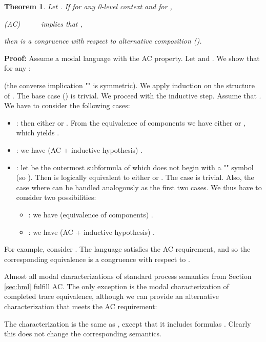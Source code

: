 \documentclass{eptcs}
\newtheorem{theo}{Theorem}
\newenvironment{theorem}{\begin{theo} \rm }{\end{theo}}
\newenvironment{proof}{\begin{trivlist} \item[\hspace{\labelsep}\bf Proof:]}{\hfill  \end{trivlist}}
\begin{document}
\begin{theorem} 
Let . If for any 0-level context  and  for ,
\begin{center}
(AC)~~~~~ implies that ,
\end{center}
then  is a congruence with respect to alternative composition ().
\end{theorem}
\begin{proof} Assume a modal language  with the AC property. Let  and . We show that for any :
\begin{center}

\end{center}
(the converse implication "" is symmetric).  We apply induction on the structure of . The base case () is trivial. We proceed with the inductive step. Assume that . We have to consider the following cases:
 
\begin{itemize}
\item : then either  or . From the equivalence of components we have either  or , which yields .

\item : we have  (AC + inductive hypothesis) .

\item : let  be the outermost subformula of  which does not begin with a "" symbol (so ). Then  is logically equivalent to either  or . The case  is trivial. Also, the case where  can be handled analogously as the first two cases. We thus have to consider two possibilities:

\begin{itemize}
\item : we have  (equivalence of components) .

\item : we have  (AC + inductive hypothesis) .
\end{itemize}

\end{itemize}
 
\end{proof} 


For example, consider . The language  satisfies the AC requirement, and so the corresponding equivalence  is a congruence with respect to . 

\vspace{2mm}

Almost all modal characterizations of standard process semantics from Section \ref{sec:hml} fulfill AC. The only exception is the modal characterization of completed trace equivalence,
although we can provide an alternative characterization that meets the AC requirement:
\begin{center}
 
\end{center}
The characterization  is the same as , except that it includes formulas . Clearly this does not change the corresponding semantics.
	 
\end{document}
